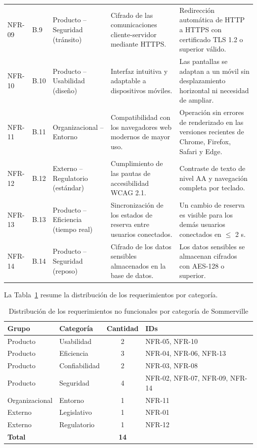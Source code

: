 \documentclass[12pt,a4paper]{article}
\begin{document}
\begin{longtable}{@{}p{1.45cm} p{0.9cm} p{2.7cm} p{4.0cm} p{4.6cm}@{}}
NFR-09 & B.9 & Producto -- Seguridad (tr\'ansito) & Cifrado de las comunicaciones cliente-servidor mediante HTTPS. & Redirecci\'on autom\'atica de HTTP a HTTPS con certificado TLS 1.2 o superior v\'alido. \\
NFR-10 & B.10 & Producto -- Usabilidad (dise\~no) & Interfaz intuitiva y adaptable a dispositivos m\'oviles. & Las pantallas se adaptan a un m\'ovil sin desplazamiento horizontal ni necesidad de ampliar. \\
NFR-11 & B.11 & Organizacional -- Entorno & Compatibilidad con los navegadores web modernos de mayor uso. & Operaci\'on sin errores de renderizado en las versiones recientes de Chrome, Firefox, Safari y Edge. \\
NFR-12 & B.12 & Externo -- Regulatorio (est\'andar) & Cumplimiento de las pautas de accesibilidad WCAG 2.1. & Contraste de texto de nivel AA y navegaci\'on completa por teclado. \\
NFR-13 & B.13 & Producto -- Eficiencia (tiempo real) & Sincronizaci\'on de los estados de reserva entre usuarios conectados. & Un cambio de reserva es visible para los dem\'as usuarios conectados en $\leq$ 2 s. \\
NFR-14 & B.14 & Producto -- Seguridad (reposo) & Cifrado de los datos sensibles almacenados en la base de datos. & Los datos sensibles se almacenan cifrados con AES-128 o superior. \\
\end{longtable}

La Tabla~\ref{tab:distribucion} resume la distribuci\'on de los requerimientos por categor\'ia.

\begin{table}[H]
\centering
\small
\caption{Distribuci\'on de los requerimientos no funcionales por categor\'ia de Sommerville}
\label{tab:distribucion}
\begin{tabular}{l l c l}
\toprule
\textbf{Grupo} & \textbf{Categor\'ia} & \textbf{Cantidad} & \textbf{IDs} \\
\midrule
Producto & Usabilidad & 2 & NFR-05, NFR-10 \\
Producto & Eficiencia & 3 & NFR-04, NFR-06, NFR-13 \\
Producto & Confiabilidad & 2 & NFR-03, NFR-08 \\
Producto & Seguridad & 4 & NFR-02, NFR-07, NFR-09, NFR-14 \\
Organizacional & Entorno & 1 & NFR-11 \\
Externo & Legislativo & 1 & NFR-01 \\
Externo & Regulatorio & 1 & NFR-12 \\
\midrule
\multicolumn{2}{l}{\textbf{Total}} & \textbf{14} & \\
\bottomrule
\end{tabular}
\end{table}
\end{document}
